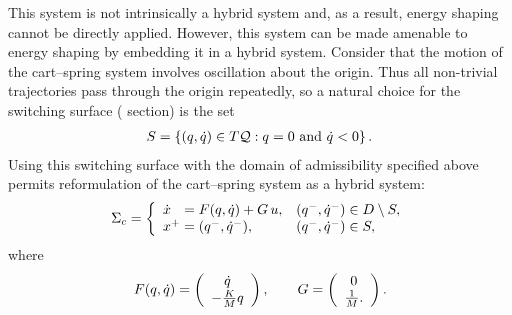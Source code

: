 This system is not intrinsically a hybrid system and, as a result, energy
shaping cannot be directly applied.
%
However, this system can be made amenable to energy shaping by embedding it
in a hybrid system.
%
Consider that the motion of the cart--spring system involves oscillation about
the origin.
%
Thus all non-trivial trajectories pass through the origin repeatedly, so a
natural choice for the switching surface (\Poincare{} section) is the set
\begin{align}
  S = \left\{ (q, \dot{q}) \in T\mathcal{Q} : q = 0 \mbox{ and } \dot{q} < 0 \right\}.
  \label{eq:cart_spring_guard}
\end{align}
%
Using this switching surface with the domain of admissibility specified above
permits reformulation of the cart--spring system as a hybrid system:
%
\begin{align}
  \Sigma_{c} = \left\{
  \begin{array}{l l}
    {\dot {x}}\hphantom{^+} = F(q, \dot{q}) + G \, u, & (q^{-}, \dot{q}^{-}) \in D \setminus
    S,\\
    x^{+} = (q^{-}, \dot{q}^{-}), & (q^{-}, \dot{q}^{-}) \in S,
  \end{array}\right.
\end{align}
where
\begin{align*}
  F(q, \dot{q}) = \left(\begin{array}{c}
      \dot{q}\\
      -\frac{K}{M} q
    \end{array}\right), \qquad
    G = \left(\begin{array}{c}
        0\\
        \frac{1}{M}.
      \end{array}\right).
\end{align*}

